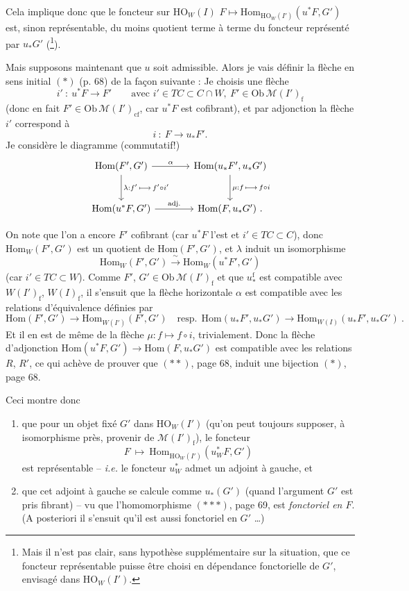 \documentclass[11pt]{article}
\newcommand{\printedpage}[1]{\marginpar{\footnotesize p.~#1}}
\newcommand{\msp}[1]{\marginpar{\footnotesize [#1]}}
\newcommand{\M}{\mathcal{M}}
\newcommand{\Hom}{\mathrm{Hom}}
\newcommand{\HO}{\mathrm{HO}}
\newcommand{\Ob}{\mathrm{Ob}\,}
\newcommand{\rf}{\mathrm{f}}
\begin{document}
\printedpage{39}

Cela implique donc que le foncteur sur $\HO_W(I)$ $F \longmapsto \Hom_{\HO_{W}(I')}(u^*F,G')$ est, sinon représentable, du moins quotient terme à terme du foncteur représenté par $u_*G'$ (\footnote[37]{Mais il n'est pas clair, sans hypothèse supplémentaire sur la situation, que ce foncteur représentable puisse être choisi en dépendance fonctorielle de $G'$, envisagé dans $\HO_W(I')$.}).

\msp{page 70}

Mais supposons maintenant que $u$ soit admissible. Alors je vais définir la flèche en sens initial $(*)$ (p. 68) de la façon suivante : Je choisis une flèche
\[
i' \ : \ u^*F \longrightarrow F' \qquad \text{avec } i' \in TC \subset C \cap W,\ F' \in \Ob \M(I')_{\rf}
\]
(donc en fait $F' \in \Ob \M(I')_{\mathrm{cf}}$, car $u^*F$ est cofibrant), et par adjonction la flèche $i'$ correspond à
\[
i \ : \ F \longrightarrow u_*F'.
\]
Je considère le diagramme (commutatif!)
\[
\begin{tikzcd}[column sep=large, row sep=large]
\Hom(F',G') \arrow[r, "\alpha"] \arrow[d, "{\scriptstyle \lambda:f'\,\longmapsto\, f'\circ i'}"] & \Hom(u_*F',u_*G') \arrow[d, "{\scriptstyle \mu:f\,\longmapsto\, f\circ i}"] \\
\Hom(u^*F,G') \arrow[r, "\text{adj.}"] & \Hom(F,u_*G')\ .
\end{tikzcd}
\]

On note que l'on a encore $F'$ cofibrant (car $u^*F$ l'est et $i' \in TC \subset C$), donc $\Hom_W(F',G')$ est un quotient de $\Hom(F',G')$, et $\lambda$ induit un isomorphisme
\[
\Hom_W(F',G') \xrightarrow{\ \sim\ } \Hom_W(u^*F',G') %
\]
(car $i' \in TC \subset W$). Comme $F'$, $G' \in \Ob \M(I')_{\rf}$ et que $u_*^{\rf}$ est compatible avec $W(I')_{\rf}$, $W(I)_{\rf}$, il s'ensuit que la flèche horizontale $\alpha$
\msp{page 71}
est compatible avec les relations d'équivalence définies par
\[
\Hom(F',G') \longrightarrow \Hom_{W(I')}(F',G') \quad \text{resp.} \ \ \Hom(u_*F',u_*G') \longrightarrow \Hom_{W(I)}(u_*F',u_*G')\ .
\]
Et il en est de même de la flèche $\mu : f \longmapsto f \circ i$, trivialement. Donc la flèche d'adjonction $\Hom(u^*F,G') \longrightarrow \Hom(F,u_*G')$ est compatible avec les relations $R$, $R'$, ce qui achève de prouver que $(**)$, page 68, induit une bijection $(*)$, page 68.

Ceci montre donc

\begin{enumerate}
\item[1°)] que pour un objet fixé $G'$ dans $\HO_W(I')$ (qu'on peut toujours supposer, à isomorphisme près, provenir de $\M(I')_{\rf}$), le foncteur
\[
F \ \longmapsto\ \Hom_{\HO_{W}(I')}(u^*_W F,G')
\]
est représentable -- \textit{i.e.} le foncteur $u^*_W$ admet un adjoint à gauche, et
\item[2°)] que cet adjoint à gauche se calcule comme $u_*(G')$ (quand l'argument $G'$ est pris fibrant) -- vu que l'homomorphisme $({*}{*}{*})$, page 69, est \textit{fonctoriel en $F$}. (A posteriori il s'ensuit qu'il est aussi fonctoriel en $G'$ \dots)
\end{enumerate}
\end{document}
